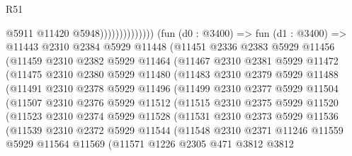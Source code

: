 \begin{lexlean}{R51}
\begin{coremodule}
                                    @5911
                                    @11420
                                    @5948))))))))))))))
        (fun (d0 : @3400) =>
        fun (d1 : @3400) =>
        @11443
          @2310
          @2384
          @5929
          @11448
          (@11451
            @2336
            @2383
            @5929
            @11456
            (@11459
              @2310
              @2382
              @5929
              @11464
              (@11467
                @2310
                @2381
                @5929
                @11472
                (@11475
                  @2310
                  @2380
                  @5929
                  @11480
                  (@11483
                    @2310
                    @2379
                    @5929
                    @11488
                    (@11491
                      @2310
                      @2378
                      @5929
                      @11496
                      (@11499
                        @2310
                        @2377
                        @5929
                        @11504
                        (@11507
                          @2310
                          @2376
                          @5929
                          @11512
                          (@11515
                            @2310
                            @2375
                            @5929
                            @11520
                            (@11523
                              @2310
                              @2374
                              @5929
                              @11528
                              (@11531
                                @2310
                                @2373
                                @5929
                                @11536
                                (@11539
                                  @2310
                                  @2372
                                  @5929
                                  @11544
                                  (@11548
                                    @2310
                                    @2371
                                    @11246
                                    @11559
                                    @5929
                                    @11564
                                    @11569
                                    (@11571
                                      @1226
                                      @2305
                                      @471
                                      @3812
                                      @3812

\end{coremodule}
\end{lexlean}
